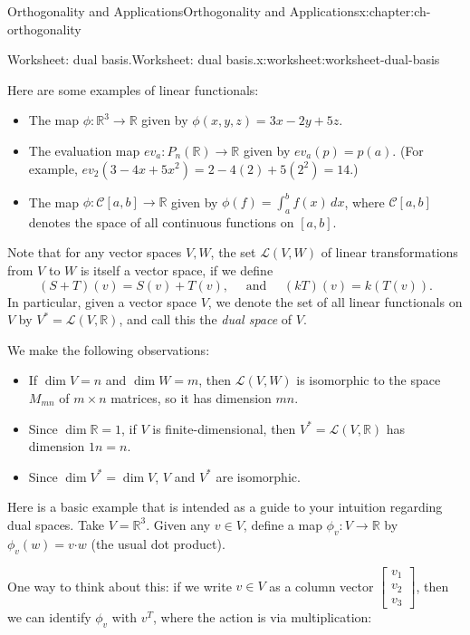\documentclass[oneside,10pt,]{book}
\numberwithin{equation}{section}
\newcommand{\bbm}{\begin{bmatrix}}
\newcommand{\ebm}{\end{bmatrix}}
\newcommand{\R}{\mathbb{R}}
\newcommand{\dotp}{\!\boldsymbol{\cdot}\!}
\begin{document}
\begin{chapterptx}{Orthogonality and Applications}{}{Orthogonality and Applications}{}{}{x:chapter:ch-orthogonality}
\begin{worksheet-section}{Worksheet: dual basis.}{}{Worksheet: dual basis.}{}{}{x:worksheet:worksheet-dual-basis}
\par
Here are some examples of linear functionals:%
\begin{itemize}[label=\textbullet]
\item{}The map \(\phi:\R^3\to \R\) given by \(\phi(x,y,z) = 3x-2y+5z\).%
\item{}The evaluation map \(ev_a:P_n(\R)\to \R\) given by \(ev_a(p) = p(a)\). (For example, \(ev_2(3-4x+5x^2) = 2-4(2)+5(2^2) = 14\).)%
\item{}The map \(\phi:\mathcal{C}[a,b]\to \R\) given by \(\phi(f) = \int_a^b f(x)\,dx\), where \(\mathcal{C}[a,b]\) denotes the space of all continuous functions on \([a,b]\).%
\end{itemize}
%
\par
Note that for any vector spaces \(V,W\), the set \(\mathcal{L}(V,W)\) of linear transformations from \(V\) to \(W\) is itself a vector space, if we define%
\begin{equation*}
(S+T)(v) = S(v)+T(v),\quad \text{ and } \quad (kT)(v)=k(T(v))\text{.}
\end{equation*}
In particular, given a vector space \(V\), we denote the set of all linear functionals on \(V\) by \(V^*=\mathcal{L}(V,\R)\), and call this the \emph{dual space} of \(V\).%
\par
We make the following observations:%
\begin{itemize}[label=\textbullet]
\item{}If \(\dim V=n\) and \(\dim W=m\), then \(\mathcal{L}(V,W)\) is isomorphic to the space \(M_{mn}\) of \(m\times n\) matrices, so it has dimension \(mn\).%
\item{}Since \(\dim \R=1\), if \(V\) is finite-dimensional, then \(V^*=\mathcal{L}(V,\R)\) has dimension \(1n=n\).%
\item{}Since \(\dim V^*=\dim V\), \(V\) and \(V^*\) are isomorphic.%
\end{itemize}
%
\par
Here is a basic example that is intended as a guide to your intuition regarding dual spaces. Take \(V = \R^3\). Given any \(v\in V\), define a map \(\phi_{v}:V\to \R\) by \(\phi_{v}(w) = v\dotp w\) (the usual dot product).%
\par
One way to think about this: if we write \(v\in V\) as a column vector \(\bbm v_1\\v_2\\v_3\ebm\), then we can identify \(\phi_{v}\) with \(v^T\), where the action is via multiplication:%
\begin{equation*}

\end{equation*}
\end{worksheet-section}
\end{chapterptx}
\end{document}
